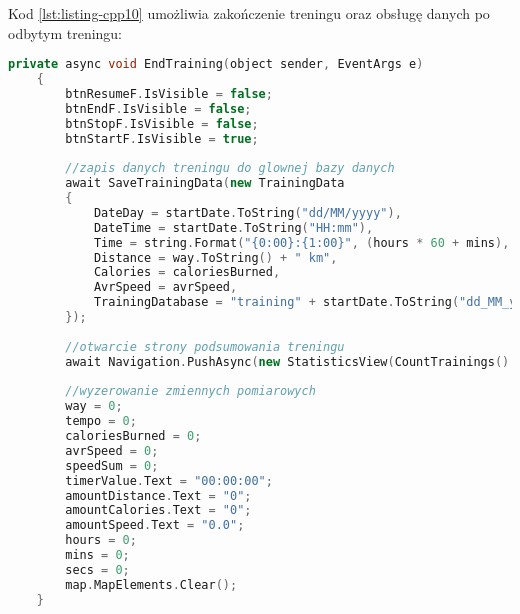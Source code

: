 Kod \ref{lst:listing-cpp10} umożliwia zakończenie treningu oraz obsługę danych po odbytym treningu:
\begin{lstlisting}[caption=Zakończenie treningu\, zapis danych do bazy i ich podsumowanie, label={lst:listing-cpp10}, language=C++]
	private async void EndTraining(object sender, EventArgs e)
	{
		btnResumeF.IsVisible = false;
		btnEndF.IsVisible = false;
		btnStopF.IsVisible = false;
		btnStartF.IsVisible = true;
		
		//zapis danych treningu do glownej bazy danych
		await SaveTrainingData(new TrainingData
		{
			DateDay = startDate.ToString("dd/MM/yyyy"),
			DateTime = startDate.ToString("HH:mm"),
			Time = string.Format("{0:00}:{1:00}", (hours * 60 + mins), secs),
			Distance = way.ToString() + " km",
			Calories = caloriesBurned,
			AvrSpeed = avrSpeed, 
			TrainingDatabase = "training" + startDate.ToString("dd_MM_yyyy_HH_mm_ss") + ".db3"
		});
		
		//otwarcie strony podsumowania treningu
		await Navigation.PushAsync(new StatisticsView(CountTrainings().Result.ToString()));
		
		//wyzerowanie zmiennych pomiarowych
		way = 0;
		tempo = 0;
		caloriesBurned = 0;
		avrSpeed = 0;
		speedSum = 0;
		timerValue.Text = "00:00:00";
		amountDistance.Text = "0";
		amountCalories.Text = "0";
		amountSpeed.Text = "0.0";
		hours = 0;
		mins = 0;
		secs = 0;
		map.MapElements.Clear();
	}
\end{lstlisting}

